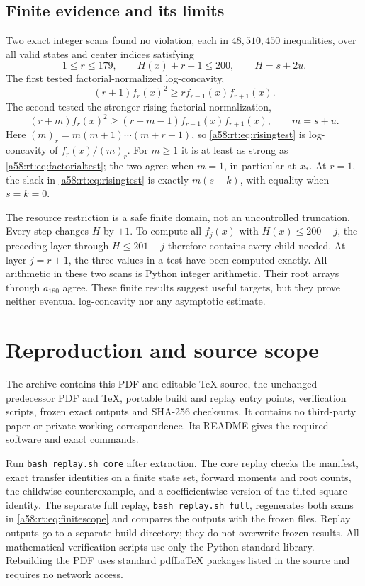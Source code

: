 \documentclass[11pt,letterpaper]{article}
\theoremstyle{remark}
\begin{document}
\subsection{Finite evidence and its limits}
Two exact integer scans found no violation, each in $48{,}510{,}450$
inequalities, over all valid states and center indices satisfying
\begin{equation}\label{a58:rt:eq:finitescope}
 1\le r\le179,\qquad H(x)+r+1\le200,\qquad H=s+2u.
\end{equation}
The first tested factorial-normalized log-concavity,
\begin{equation}\label{a58:rt:eq:factorialtest}
 (r+1)f_r(x)^2\ge r f_{r-1}(x)f_{r+1}(x).
\end{equation}
The second tested the stronger rising-factorial normalization,
\begin{equation}\label{a58:rt:eq:risingtest}
 (r+m)f_r(x)^2\ge(r+m-1)f_{r-1}(x)f_{r+1}(x),
 \qquad m=s+u.
\end{equation}
Here $(m)_r=m(m+1)\cdots(m+r-1)$, so \eqref{a58:rt:eq:risingtest} is
log-concavity of $f_r(x)/(m)_r$. For $m\ge1$ it is at least as strong
as \eqref{a58:rt:eq:factorialtest}; the two agree when $m=1$, in particular
at $x_*$. At $r=1$, the slack in \eqref{a58:rt:eq:risingtest} is exactly
$m(s+k)$, with equality when $s=k=0$.

The resource restriction is a safe finite domain, not an uncontrolled
truncation. Every step changes $H$ by $\pm1$. To compute all $f_j(x)$
with $H(x)\le200-j$, the preceding layer through $H\le201-j$
therefore contains every child needed. At layer $j=r+1$, the three
values in a test have been computed exactly. All arithmetic in these
two scans is Python integer arithmetic. Their root arrays through
$a_{180}$ agree. These finite results suggest useful targets, but they
prove neither eventual log-concavity nor any asymptotic estimate.

\section{Reproduction and source scope}\label{a58:rt:sec:reproduction}
The archive contains this PDF and editable TeX source, the unchanged
predecessor PDF and TeX, portable build and replay entry points,
verification scripts, frozen exact outputs and SHA-256 checksums.
It contains no third-party paper or private working correspondence.
Its README gives the required software and exact commands.

Run \texttt{bash replay.sh core} after extraction. The core replay
checks the manifest, exact transfer identities on a finite state set,
forward moments and root counts, the childwise counterexample, and a
coefficientwise version of the tilted square identity. The separate
full replay, \texttt{bash replay.sh full}, regenerates both scans in
\eqref{a58:rt:eq:finitescope} and compares the outputs with the frozen files.
Replay outputs go to a separate build directory; they do not overwrite
frozen results. All mathematical verification scripts use only the
Python standard library. Rebuilding the PDF uses standard pdfLaTeX
packages listed in the source and requires no network access.
\end{document}
